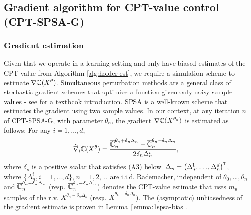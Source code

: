 \subsection{Gradient algorithm for CPT-value control (CPT-SPSA-G)}
\label{sec:1spsa}

\subsubsection*{Gradient estimation} 
Given that we operate in a learning setting and only have biased estimates of the CPT-value from Algorithm \ref{alg:holder-est}, we require a simulation scheme to estimate $\nabla \mathbb{C}(X^\theta)$.  
Simultaneous perturbation methods are a general class of stochastic gradient schemes that optimize a function given only noisy sample values - see \cite{Bhatnagar13SR} for a textbook introduction. SPSA is a well-known scheme that estimates the gradient using two sample values. In our context, at any iteration $n$ of CPT-SPSA-G, with parameter $\theta_n$, the gradient $\nabla \mathbb{C}(X^{\theta_n})$ is estimated as follows: For any  $i=1,\ldots,d$,
\begin{align}
\widehat \nabla_{i} \mathbb{C}(X^\theta) = \dfrac{\overline {\mathbb{C}}_n^{\theta_n+\delta_n \Delta_n} - \overline {\mathbb{C}}_n^{\theta_n-\delta_n \Delta_n}}{2 \delta_n \Delta_n^{i}},\label{eq:grad-est-spsa}
\end{align}
where $\delta_n$ is a positive scalar that satisfies (A3) below, $\Delta_n = \left( \Delta_n^{1},\ldots,\Delta_n^{d}\right)^\mathsf{\scriptscriptstyle T}$, where $\{\Delta_n^{i}, i=1,\ldots,d\}$, $n=1,2,\ldots$ are i.i.d. Rademacher, independent of $\theta_0,\ldots,\theta_n$ and $\overline {\mathbb{C}}_n^{\theta_n+\delta_n \Delta_n}$ (resp. $\overline {\mathbb{C}}_n^{\theta_n-\delta_n \Delta_n}$) denotes the CPT-value estimate that uses $m_n$ samples of the r.v. $X^{\theta_n+\delta_n \Delta_n}$ (resp. $\overline X^{\theta_n-\delta_n \Delta_n}$).
The (asymptotic) unbiasedness of the gradient estimate is proven in Lemma \ref{lemma:1spsa-bias}.




